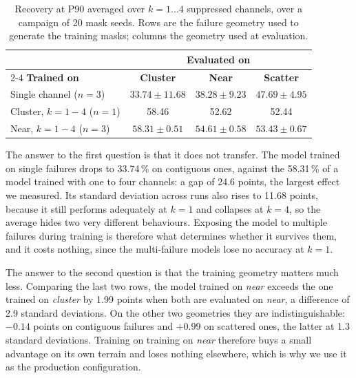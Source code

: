\documentclass[10pt,conference]{IEEEtran}
\begin{document}
\begin{table}[t]
\centering
\caption{Recovery at P90 averaged over $k=1\dots4$ suppressed channels, over a
campaign of 20 mask seeds. Rows are the failure geometry used to generate the
training masks; columns the geometry used at evaluation.}
\label{tab:multidead}
\begin{tabular}{@{}lccc@{}}
\toprule
& \multicolumn{3}{c}{\textbf{Evaluated on}} \\
\cmidrule(l){2-4}
\textbf{Trained on} & \textbf{Cluster} & \textbf{Near} & \textbf{Scatter} \\
\midrule
Single channel ($n{=}3$)
  & $33.74 \pm 11.68$ & $38.28 \pm 9.23$ & $47.69 \pm 4.95$ \\
Cluster, $k{=}1\!-\!4$ ($n{=}1$)
  & 58.46 & 52.62 & 52.44 \\
Near, $k{=}1\!-\!4$ ($n{=}3$)
  & $58.31 \pm 0.51$ & $54.61 \pm 0.58$ & $53.43 \pm 0.67$ \\
\bottomrule
\end{tabular}
\end{table}

The answer to the first question is that it does not transfer. The model trained
on single failures drops to 33.74\,\% on contiguous ones, against the 58.31\,\%
of a model trained with one to four channels: a gap of 24.6 points, the largest
effect we measured. Its standard deviation across runs also rises to 11.68
points, because it still performs adequately at $k=1$ and collapses at $k=4$, so
the average hides two very different behaviours. Exposing the model to multiple
failures during training is therefore what determines whether it survives them,
and it costs nothing, since the multi-failure models lose no accuracy at $k=1$.

The answer to the second question is that the training geometry matters much
less. Comparing the last two rows, the model trained on \emph{near} exceeds the
one trained on \emph{cluster} by 1.99 points when both are evaluated on
\emph{near}, a difference of 2.9 standard deviations. On the other two
geometries they are indistinguishable: $-0.14$ points on contiguous failures and
$+0.99$ on scattered ones, the latter at 1.3 standard deviations. Training on
training on \emph{near} therefore buys a small advantage on its own terrain
and loses nothing elsewhere, which is why we use it as the production
configuration.
\end{document}
